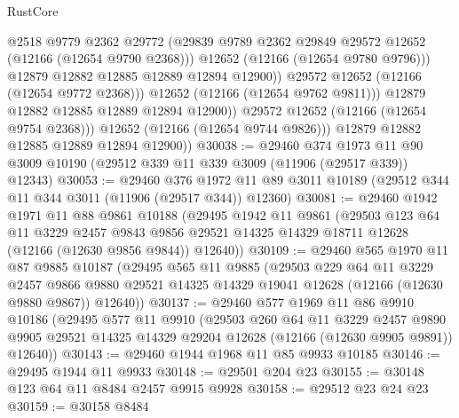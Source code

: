 \begin{lexlean}{RustCore}
\begin{coremodule}
                          @2518
                          @9779
                          @2362
                          @29772
                          (@29839 @9789 @2362 @29849 @29572 @12652 (@12166 (@12654 @9790 @2368)))
                          @12652
                          (@12166 (@12654 @9780 @9796)))
                        @12879
                        @12882
                        @12885
                        @12889
                        @12894
                        @12900))
                    @29572
                    @12652
                    (@12166 (@12654 @9772 @2368)))
                  @12652
                  (@12166 (@12654 @9762 @9811)))
                @12879
                @12882
                @12885
                @12889
                @12894
                @12900))
            @29572
            @12652
            (@12166 (@12654 @9754 @2368)))
          @12652
          (@12166 (@12654 @9744 @9826)))
        @12879
        @12882
        @12885
        @12889
        @12894
        @12900))
@30038 := @29460
    @374
    @1973
    @11
    @90
    @3009
    @10190
    (@29512 @339 @11 @339 @3009 (@11906 (@29517 @339)) @12343)
@30053 := @29460
    @376
    @1972
    @11
    @89
    @3011
    @10189
    (@29512 @344 @11 @344 @3011 (@11906 (@29517 @344)) @12360)
@30081 := @29460
    @1942
    @1971
    @11
    @88
    @9861
    @10188
    (@29495
      @1942
      @11
      @9861
      (@29503
        @123
        @64
        @11
        @3229
        @2457
        @9843
        @9856
        @29521
        @14325
        @14329
        @18711
        @12628
        (@12166 (@12630 @9856 @9844))
        @12640))
@30109 := @29460
    @565
    @1970
    @11
    @87
    @9885
    @10187
    (@29495
      @565
      @11
      @9885
      (@29503
        @229
        @64
        @11
        @3229
        @2457
        @9866
        @9880
        @29521
        @14325
        @14329
        @19041
        @12628
        (@12166 (@12630 @9880 @9867))
        @12640))
@30137 := @29460
    @577
    @1969
    @11
    @86
    @9910
    @10186
    (@29495
      @577
      @11
      @9910
      (@29503
        @260
        @64
        @11
        @3229
        @2457
        @9890
        @9905
        @29521
        @14325
        @14329
        @29204
        @12628
        (@12166 (@12630 @9905 @9891))
        @12640))
@30143 := @29460 @1944 @1968 @11 @85 @9933 @10185
@30146 := @29495 @1944 @11 @9933
@30148 := @29501 @204 @23
@30155 := @30148 @123 @64 @11 @8484 @2457 @9915 @9928
@30158 := @29512 @23 @24 @23
@30159 := @30158 @8484

\end{coremodule}
\end{lexlean}
